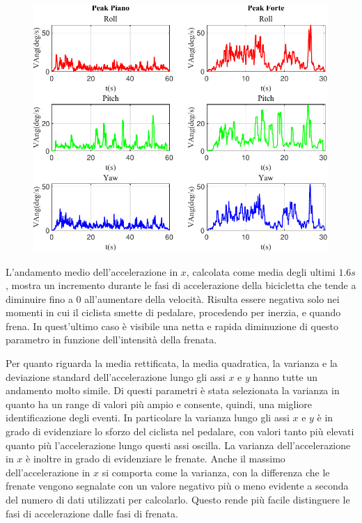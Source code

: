 \documentclass[class=article]{standalone}
\begin{document}
	\begin{center}
		\begin{figure}[h]
			\centering\includegraphics[width=.9\textwidth]{img/lungaFP/VAng/Peak}
			\caption[]{}
			\label{fig:VAngPeak_lungaFP}
		\end{figure}
	\end{center}
	
	L'andamento medio dell'accelerazione in \(x\), calcolata come media degli ultimi \(1.6s\), mostra un incremento durante le fasi di accelerazione della bicicletta che tende a diminuire fino a \(0\) all'aumentare della velocità.
	Risulta essere negativa solo nei momenti in cui il ciclista smette di pedalare, procedendo per inerzia, e quando frena. In quest'ultimo caso è visibile una netta e rapida diminuzione di questo parametro in funzione dell'intensità della frenata.
	
	Per quanto riguarda la media rettificata, la media quadratica, la varianza e la deviazione standard dell'accelerazione lungo gli assi \(x\) e \(y\) hanno tutte un andamento molto simile. Di questi parametri è stata selezionata la varianza in quanto ha un range di valori più ampio e consente, quindi, una migliore identificazione degli eventi. In particolare la varianza lungo gli assi \(x\) e \(y\) è in grado di evidenziare lo sforzo del ciclista nel pedalare, con valori tanto più elevati quanto più l'accelerazione lungo questi assi oscilla. La varianza dell'accelerazione in \(x\) è inoltre in grado di evidenziare le frenate.
	Anche il massimo dell'accelerazione in \(x\) si comporta come la varianza, con la differenza che le frenate vengono segnalate con un valore negativo più o meno evidente a seconda del numero di dati utilizzati per calcolarlo. Questo rende più facile distinguere le fasi di accelerazione dalle fasi di frenata.
	
\end{document}
